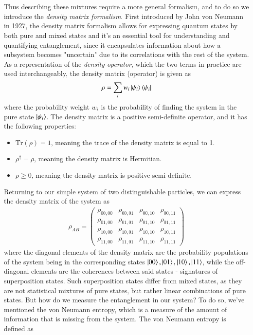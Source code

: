 \documentclass{subfiles}
\begin{document}
\\ \\ 
Thus describing these mixtures require a more general formalism, and to do so we introduce the \emph{density matrix formalism}. First introduced by John von Neumann in 1927\cite{neumann1927}, the density matrix formalism allows for expressing quantum states by both pure and mixed states and it's an essential tool for understanding and quantifying entanglement, since it encapsulates information about how a subsystem becomes "uncertain" due to its correlations with the rest of the system. As a representation of the \emph{density operator}, which the two terms in practice are used interchangeably, the density matrix (operator) is given as
\begin{equation}
    \rho = \sum_i w_i\ket{\psi_i}\bra{\psi_i}\label{eq:density_matrix}
\end{equation}
where the probability weight $w_i$ is the probability of finding the system in the pure state $\ket{\psi_i}$. The density matrix is a positive semi-definite operator, and it has the following properties:
\begin{itemize}
    \item $\text{Tr}(\rho) = 1$, meaning the trace of the density matrix is equal to 1.
    \item $\rho^\dagger = \rho$, meaning the density matrix is Hermitian.
    \item $\rho \geq 0$, meaning the density matrix is positive semi-definite.
\end{itemize}
Returning to our simple system of two distinguishable particles, we can express the density matrix of the system as
\begin{align*}
    \rho_{AB} = \begin{pmatrix}
        \rho_{00, 00} & \rho_{00, 01} & \rho_{00, 10} & \rho_{00, 11} \\
        \rho_{01, 00} & \rho_{01, 01} & \rho_{01, 10} & \rho_{01, 11} \\
        \rho_{10, 00} & \rho_{10, 01} & \rho_{10, 10} & \rho_{10, 11} \\
        \rho_{11, 00} & \rho_{11, 01} & \rho_{11, 10} & \rho_{11, 11}
    \end{pmatrix}
\end{align*}
where the diagonal elements of the density matrix are the probability populations of the system being in the corresponding states $\ket{00}, \ket{01}, \ket{10}, \ket{11}$, while the off-diagonal elements are the coherences between said states - signatures of superposition states. Such superposition states differ from mixed states, as they are not statistical mixtures of pure states, but rather linear combinations of pure states. But how do we measure the entanglement in our system? To do so, we've mentioned the von Neumann entropy, which is a measure of the amount of information that is missing from the system. The von Neumann entropy is defined as
\end{document}
